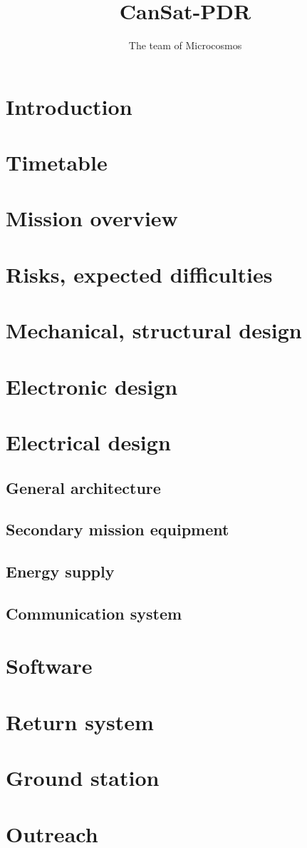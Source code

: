 \documentclass[english,12pt,a4paper]{article}
\title{CanSat-PDR}
\author{The team of Microcosmos}
\begin{document}
	\maketitle
	\tableofcontents
	\section{Introduction}
	\section{Timetable}
	\section{Mission overview}
	\section{Risks, expected difficulties}
	\section{Mechanical, structural design}
	\section{Electronic design}
	\section{Electrical design}
		\subsection{General architecture}
		\subsection{Secondary mission equipment}
		\subsection{Energy supply}
		\subsection{Communication system}
	\section{Software}
	\section{Return system}
	\section{Ground station}
	\section{Outreach}
\end{document}
